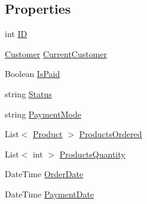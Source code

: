 \subsection*{Properties}
\begin{DoxyCompactItemize}
\item 
int \hyperlink{class_health___assignment_1_1_sales_ae2c176fd1cca2793a66286cb29d6b079}{ID}
\item 
\hyperlink{class_health___assignment_1_1_customer}{Customer} \hyperlink{class_health___assignment_1_1_sales_ac38dbbb884d72a7506cdfdde941dd023}{Current\+Customer}
\item 
Boolean \hyperlink{class_health___assignment_1_1_sales_a38ded65c3b9ef70d85ff9ba294e96c95}{Is\+Paid}
\item 
string \hyperlink{class_health___assignment_1_1_sales_a00a1f4c6d8659e41a022c71de0c37d79}{Status}
\item 
string \hyperlink{class_health___assignment_1_1_sales_a0247dd9fcbc13a47cb7903e895f25c86}{Payment\+Mode}
\item 
List$<$ \hyperlink{class_health___assignment_1_1_product}{Product} $>$ \hyperlink{class_health___assignment_1_1_sales_a9711c6a1bdec1cbec0a7db10dbb72255}{Products\+Ordered}
\item 
List$<$ int $>$ \hyperlink{class_health___assignment_1_1_sales_af8647e05a6205e0226370636708ae02b}{Products\+Quantity}
\item 
Date\+Time \hyperlink{class_health___assignment_1_1_sales_ac560a0b0512af2e4c48f014404e8a2ae}{Order\+Date}
\item 
Date\+Time \hyperlink{class_health___assignment_1_1_sales_aa42598f506371011de00c396d4101de1}{Payment\+Date}
\end{DoxyCompactItemize}


